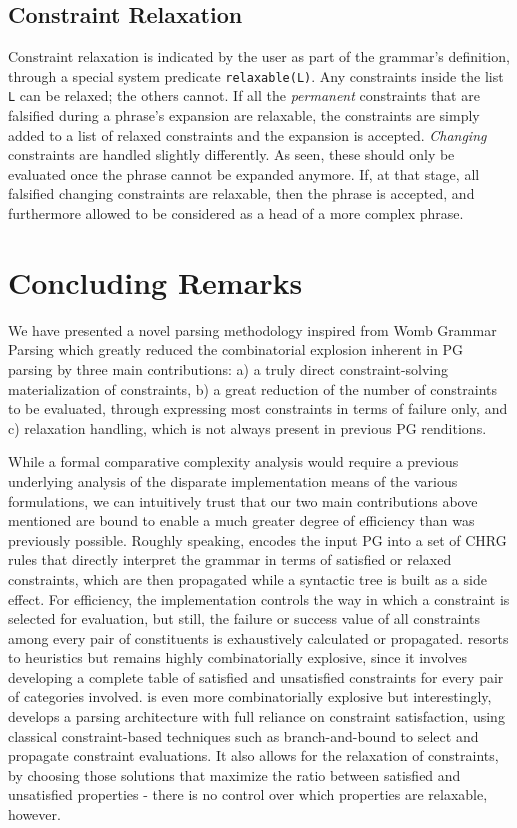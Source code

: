 \documentclass{llncs}
\begin{document}

\subsection{Constraint Relaxation}

Constraint relaxation is indicated by the user as part of the grammar's definition, through a special system predicate \texttt{relaxable(L)}. Any constraints inside the list \texttt{L} can be relaxed; the others cannot. If all the \emph{permanent} constraints that are falsified during a phrase's expansion are relaxable, the constraints are simply added to a list of relaxed constraints and the expansion is accepted.  \emph{Changing} constraints are handled slightly differently. As seen, these should only be evaluated once the phrase cannot be expanded anymore. If, at that stage, all falsified changing constraints are relaxable, then the phrase is accepted, and furthermore allowed to be considered as a head of a more complex phrase.


\section{Concluding Remarks}

We have presented a novel parsing methodology inspired from Womb Grammar Parsing which greatly reduced the combinatorial explosion inherent in PG parsing by three main contributions: a) a truly direct constraint-solving materialization of constraints,  b) a great reduction of the number of constraints to be evaluated, through expressing most constraints in terms of failure only, and c) relaxation handling, which is not always present  in previous  PG renditions.

While a formal comparative complexity analysis would require a previous underlying  analysis of the disparate implementation means of the various formulations, we can intuitively trust that our two main contributions above mentioned are bound to enable a much greater degree of efficiency than  was previously possible. Roughly speaking, \cite{DB04} encodes the input PG into a set of CHRG rules that directly interpret the grammar in terms of satisfied or relaxed constraints, which are then propagated while a syntactic tree is built as a side effect. For efficiency, the implementation controls  the way in which a constraint is selected for evaluation, but still, the failure or success value of all constraints among every pair of constituents is exhaustively calculated or propagated.  \cite{BM00} resorts to heuristics but remains highly combinatorially explosive, since it involves developing a complete table of satisfied and unsatisfied constraints for every pair of categories involved. \cite{logcom13DuchierEtAl} is even more combinatorially explosive but interestingly, develops a parsing architecture with  full reliance on constraint satisfaction, using classical constraint-based techniques such as branch-and-bound to select and propagate constraint evaluations. It also allows for the relaxation of constraints, by choosing those solutions that maximize the ratio between satisfied and unsatisfied properties - there is no control over which properties are relaxable, however. 
\end{document}
